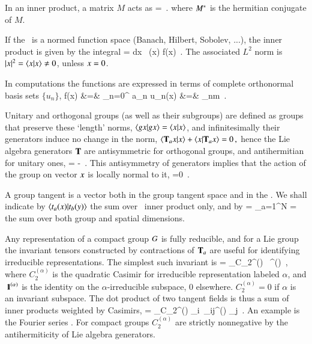 In an inner product, a matrix $M$ acts as
\beq
{} =
\,.
where $\dual{M}$ is the hermitian conjugate of $M$.

If the \statesp\ is a normed function space (Banach, Hilbert, Sobolev, ...),
the inner product is given by the integral
\beq
{} = \int dx \, (x) f(x)
\,.
The associated $L^2$ norm is
$|\ssp|^2 = \braket{\ssp}{\ssp} \neq 0$, unless $\ssp = 0$.

In computations the functions are expressed in terms of
complete orthonormal basis sets $\{u_n\}$,
\bea
f(x) &=& \sum_{n=0}^{\infty} a_n u_n(x)
    \continue
{} &=& \delta_{nm}
\,.
\label{basisL2}
\eea

                                                        \inCB
Unitary and orthogonal groups (as well as their subgroups) are defined as
groups that preserve these `length' norms, $\braket{\LieEl x}{\LieEl x} =
\braket{x}{x}$, and infinitesimally their generators
 induce no change in the norm,
\(
\braket{ \Lg_a\ssp}{\ssp}
  +\braket{\ssp}{\Lg_a\ssp} =0
\,,
\)
hence the Lie algebra generators $\mathbf{T}$ are antisymmetric for orthogonal
groups, and antihermitian for unitary ones,
\beq
\dual{\Lg} = - \Lg
\,.
This antisymmetry of generators implies that the action of the group on
vector $x$ is locally normal to it,
\beq
{} =0
\,.

A group tangent  is a vector both in the group tangent
space and in the \statesp. We shall indicate by
$\braket{\groupTan_{a}(x)}{\groupTan_{b}(y)}$  the sum over \statesp\
inner product only, and by
\beq
{} =
    \sum_{a=1}^N  =
the sum over both group and spatial dimensions.

Any representation of a compact group $G$ is fully
reducible, and for a Lie group
the invariant tensors constructed by contractions
of $\mathbf{T}_a$ are useful for identifying irreducible
representations. The simplest such invariant is
\beq
\dual{\Lg} \cdot \Lg = \sum_\alpha C_2^{(\alpha)} \, \id^{(\alpha)}
\,,
where $C_2^{(\alpha)}$ is the quadratic Casimir for
irreducible representation labeled $\alpha$, and
${\ \hbox{{\rm 1}\kern-.6em\hbox{\rm 1}}}^{(\alpha)}$ is the identity on the $\alpha$-irreducible
subspace, 0 elsewhere. $ C_2^{(\alpha)} =0$ if $\alpha$
is an invariant subspace.
The dot product of two tangent fields
 is thus a sum of inner products
weighted by Casimirs,
\beq
\braket{\groupTan(\sspRed)}{\groupTan(\slicep)}
   = \sum_\alpha C_2^{(\alpha)} \dual{\sspRed}_i\, \delta_{ij}^{(\alpha)} \slicep_j
\,.
An example is the Fourier series .
For compact groups $C_2^{(\alpha)}$ are strictly nonnegative by
the antihermiticity  of Lie algebra generators.
